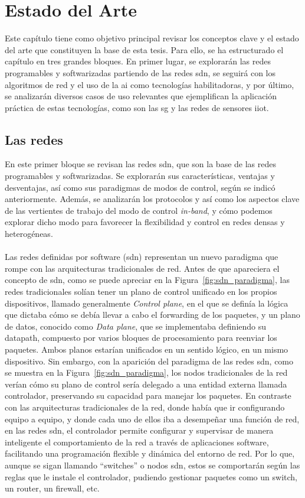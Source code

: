 \chapter{Estado del Arte}
\label{ch:sota}

Este capítulo tiene como objetivo principal revisar los conceptos clave y el estado del arte que constituyen la base de esta tesis. Para ello, se ha estructurado el capítulo en tres grandes bloques. En primer lugar, se explorarán las redes programables y softwarizadas partiendo de las redes \gls{sdn}, se seguirá con los algoritmos de red y el uso de la \gls{ai} como tecnologías habilitadoras, y por último, se analizarán diversos casos de uso relevantes que ejemplifican la aplicación práctica de estas tecnologías, como son las \gls{sg} y las redes de sensores \gls{iiot}. 

\section{Las redes }
\label{sec:redes_sdn} 

En este primer bloque se revisan las redes \gls{sdn}, que son la base de las redes programables y softwarizadas. Se explorarán sus características, ventajas y desventajas, así como sus paradigmas de modos de control, según se indicó anteriormente. Además, se analizarán los protocolos y así como los aspectos clave de las vertientes de trabajo del modo de control \textit{in-band}, y cómo podemos explorar dicho modo para favorecer la flexibilidad y control en redes densas y heterogéneas.\\
\\
Las redes definidas por software (\gls{sdn}) representan un nuevo paradigma que rompe con las arquitecturas tradicionales de red. Antes de que apareciera el concepto de \gls{sdn}, como se puede apreciar en la Figura~\ref{fig:sdn_paradigma}, las redes tradicionales solían tener un plano de control unificado en los propios dispositivos, llamado generalmente \textit{Control plane}, en el que se definía la lógica que dictaba cómo se debía llevar a cabo el forwarding de los paquetes, y un plano de datos, conocido como \textit{Data plane}, que se implementaba definiendo su datapath, compuesto por varios bloques de procesamiento para reenviar los paquetes. Ambos planos estarían unificados en un sentido lógico, en un mismo dispositivo. Sin embargo, con la aparición del paradigma de las redes \gls{sdn}, como se muestra en la Figura~\ref{fig:sdn_paradigma}, los nodos tradicionales de la red verían cómo su plano de control sería delegado a una entidad externa llamada controlador, preservando su capacidad para manejar los paquetes. En contraste con las arquitecturas tradicionales de la red, donde había que ir configurando equipo a equipo, y donde cada uno de ellos iba a desempeñar una función de red, en las redes \gls{sdn}, el controlador permite configurar y supervisar de manera inteligente el comportamiento de la red a través de aplicaciones software, facilitando una programación flexible y dinámica del entorno de red. Por lo que, aunque se sigan llamando ``switches'' o nodos \gls{sdn}, estos se comportarán según las reglas que le instale el controlador, pudiendo gestionar paquetes como un switch, un router, un firewall, etc. 

